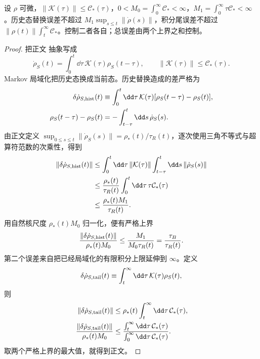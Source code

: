 \begin{proposition}[记忆核局域化的双重误差界]
设 $\rho$ 可微，$\|\mathcal K(\tau)\|\le\mathcal C_*(\tau)$，$0<M_0=\int_0^\infty\mathcal C_*<\infty$，$M_1=\int_0^\infty\tau\mathcal C_*<\infty$。历史态替换误差不超过 $M_1\sup_{s\le t}\|\dot\rho(s)\|$，积分尾误差不超过 $\|\rho(t)\|\int_t^\infty\mathcal C_*$。控制二者各自；总误差由两个上界之和控制。
\end{proposition}
\begin{proof}
把正文 抽象写成
\[
\dot\rho_S(t)=\int_0^t\dd\tau\,\mathcal K(\tau)\rho_S(t-\tau),
\qquad
\|\mathcal K(\tau)\|\le\mathcal C_*(\tau).
\]
Markov 局域化把历史态换成当前态。历史替换造成的差严格为
\begin{align*}
\delta\dot\rho_{S,{\rm hist}}(t)
&\equiv
\int_0^t\dd\tau\,\mathcal K(\tau)
[\rho_S(t-\tau)-\rho_S(t)],\\
\rho_S(t-\tau)-\rho_S(t)
&=-\int_{t-\tau}^{t}\dd s\,\dot\rho_S(s).
\end{align*}
由正文定义
$\sup_{0\le s\le t}\|\dot\rho_S(s)\|=\rho_*(t)/\tau_R(t)$，逐次使用三角不等式与超算符范数的次乘性，得到
\begin{align*}
\|\delta\dot\rho_{S,{\rm hist}}(t)\|
&\le
\int_0^t\dd\tau\,\|\mathcal K(\tau)\|
\int_{t-\tau}^{t}\dd s\,\|\dot\rho_S(s)\|\\
&\le
\frac{\rho_*(t)}{\tau_R(t)}
\int_0^t\dd\tau\,\tau\mathcal C_*(\tau)\\
&\le
\frac{\rho_*(t)M_1}{\tau_R(t)}.
\end{align*}
用自然核尺度 $\rho_*(t)M_0$ 归一化，便有严格上界
\begin{equation*}
\frac{\|\delta\dot\rho_{S,{\rm hist}}(t)\|}{\rho_*(t)M_0}
\le
\frac{M_1}{M_0\tau_R(t)}
=\frac{\tau_B}{\tau_R(t)}.
\end{equation*}
第二个误差来自把已经局域化的有限积分上限延伸到 $\infty$。定义
\[
\delta\dot\rho_{S,{\rm tail}}(t)
\equiv
\int_t^\infty\dd\tau\,\mathcal K(\tau)\rho_S(t),
\]
则
\begin{align*}
\|\delta\dot\rho_{S,{\rm tail}}(t)\|
&\le
\rho_*(t)\int_t^\infty\dd\tau\,\mathcal C_*(\tau),\\
\frac{\|\delta\dot\rho_{S,{\rm tail}}(t)\|}{\rho_*(t)M_0}
&\le
\frac{\int_t^\infty\dd\tau\,\mathcal C_*(\tau)}
{\int_0^\infty\dd\tau\,\mathcal C_*(\tau)}.
\end{align*}
取两个严格上界的最大值，就得到正文。
\end{proof}


